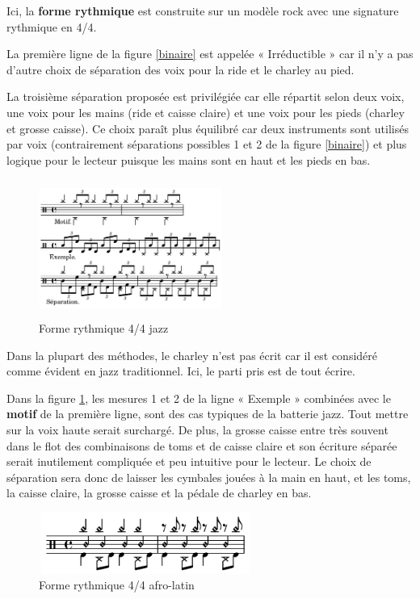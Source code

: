 Ici, la \textbf{forme rythmique} est construite sur un modèle rock avec une
signature rythmique en 4/4.

La première ligne de la figure \ref{binaire} est
appelée « Irréductible » car il n’y a pas d’autre choix de séparation des voix
pour la ride et le charley au pied.

La troisième séparation proposée est privilégiée car elle répartit selon deux 
voix, une voix pour les mains (ride et caisse claire) et une voix pour les
pieds (charley et grosse caisse). Ce choix paraît plus équilibré car deux
instruments sont utilisés par voix (contrairement séparations possibles 1 et 2
de la figure \ref{binaire}) et plus logique pour le lecteur puisque les mains
sont en haut et les pieds en bas.

\begin{figure}[h]
\centering
\includegraphics[height=45mm, width=60mm]{
z_images/3_methodes/2_systemes/2_separation_4-4_jazz.png}
\caption{Forme rythmique 4/4 jazz}
\label{jazz}
\end{figure}
\newpage
Dans la plupart des méthodes, le charley n’est pas écrit car il est considéré
comme évident en jazz traditionnel. Ici, le parti pris est de tout écrire.

Dans la figure \ref{jazz}, les mesures 1 et 2 de la ligne « Exemple » combinées
avec le \textbf{motif} de la première ligne, sont des cas typiques de la
batterie jazz. Tout mettre sur la voix haute serait surchargé. De plus, la
grosse caisse entre très souvent dans le flot des combinaisons de toms et de
caisse claire et son écriture séparée serait inutilement compliquée et peu
intuitive pour le lecteur. Le choix de séparation sera donc de laisser les
cymbales jouées à la main en haut, et les toms, la caisse claire, la grosse
caisse et la pédale de charley en bas.

\begin{figure}[h]
	\centering
	\includegraphics[height=20mm, width=70mm]{
    z_images/3_methodes/2_systemes/3_separation_afro-latins.png}
	\caption{Forme rythmique 4/4 afro-latin}
	\label{afro_latin}
\end{figure}


